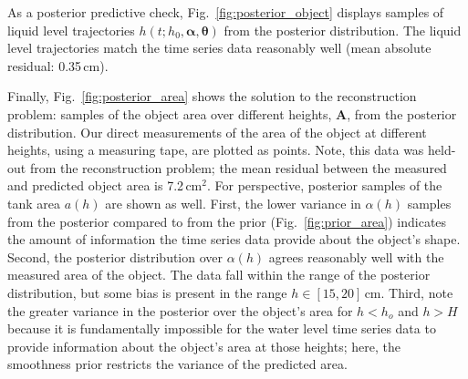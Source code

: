\documentclass[openacc]{rsproca_new}%
\newcommand\themodel {$h(t; h_0, \boldsymbol \alpha, \boldsymbol\theta)$\xspace}
\begin{document}
As a posterior predictive check, Fig.~\ref{fig:posterior_object} displays samples of liquid level trajectories \themodel from the posterior distribution. The liquid level trajectories match the time series data reasonably well (mean absolute residual: 0.35\,cm). 

Finally, Fig.~\ref{fig:posterior_area} shows the solution to the reconstruction problem: samples of the object area over different heights, $\mathbf{A}$, from the posterior distribution. Our direct measurements of the area of the object at different heights, using a measuring tape, are plotted as points. Note, this data was held-out from the reconstruction problem; the mean residual between the measured and predicted object area is 7.2\,cm$^2$.
For perspective, posterior samples of the tank area $a(h)$ are shown as well. 
First, the lower variance in $\alpha(h)$ samples from the posterior compared to from the prior (Fig.~\ref{fig:prior_area}) indicates the amount of information the time series data provide about the object's shape. 
Second, the posterior distribution over $\alpha(h)$ agrees reasonably well with the measured area of the object. The data fall within the range of the posterior distribution, but some bias is present in the range $h\in[15, 20]$\,cm. 
Third, note the greater variance in the posterior over the object's area for $h<h_o$ and $h>H$ because it is fundamentally impossible for the water level time series data to provide information about the object's area at those heights; here, the smoothness prior restricts the variance of the predicted area. 
 
\end{document}
